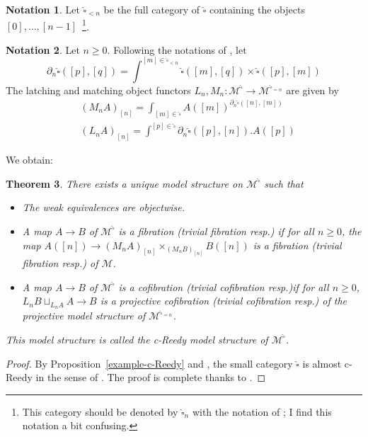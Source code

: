 \documentclass[a4paper,12pt]{amsart}
\newcommand{\de}{\partial}
\newcommand{\p}{\times}
\newtheorem{thm}{Theorem}[section]
\newcommand{\bth}{\begin{thm}}
\renewcommand{\eth}{\end{thm}}
\newcommand{\bpf}{\begin{proof}}
\newcommand{\epf}{\end{proof}}
\theoremstyle{definition}
\newtheorem{nota}[thm]{Notation}
\renewcommand{\geq}{\geqslant}
\begin{document}
\begin{nota}
	Let $\widehat{\square}_{<n}$ be the full category of $\widehat{\square}$ containing the objects $[0],\dots,[n-1]$~\footnote{This category should be denoted by $\widehat{\square}_n$ with the notation of \cite{c-Reedy}; I find this notation a bit confusing.}. 
\end{nota}

\begin{nota} \label{def}
	Let $n\geq 0$. Following the notations of \cite[page~37]{c-Reedy}, let 
	\[
	\de_n\widehat{\square}([p],[q]) = \int^{[m]\in \widehat{\square}_{<n}} \widehat{\square}([m],[q]) \p \widehat{\square}([p],[m])
	\]
The latching and matching object functors $L_n,M_n:\mathcal{M}^{\widehat{\square}}\to \mathcal{M}^{\widehat{\square}_{=n}}$ are given by
\begin{align*}
	& (M_nA)_{[n]} = \int_{[m]\in \widehat{\square}} A([m])^{\de_n\widehat{\square}([n],[m])} \\
	& (L_nA)_{[n]} = \int^{[p]\in \widehat{\square}}\de_n\widehat{\square}([p],[n]) . A([p]) 
\end{align*}
\end{nota}


We obtain: 

\bth \label{c-Reedy-model}
There exists a unique model structure on $\mathcal{M}^{\widehat{\square}}$ such that 
\begin{itemize}
	\item The weak equivalences are objectwise.
	\item A map $A\to B$ of $\mathcal{M}^{\widehat{\square}}$ is a fibration (trivial fibration resp.) if for all $n\geq 0$, the map $A([n])\to (M_nA)_{[n]}\p_{(M_nB)_{[n]}} B([n])$ is a fibration (trivial fibration resp.) of $\mathcal{M}$.
	\item A map $A\to B$ of $\mathcal{M}^{\widehat{\square}}$ is a cofibration (trivial cofibration resp.)if for all $n\geq 0$, $L_nB\sqcup_{L_nA} A\to B$ is a projective cofibration (trivial cofibration resp.) of the projective model structure of $\mathcal{M}^{\widehat{\square}_{=n}}$.
\end{itemize}
This model structure is called the \textit{c-Reedy model structure} of $\mathcal{M}^{\widehat{\square}}$. 
\eth

\bpf
By Proposition~\ref{example-c-Reedy} and \cite[Theorem~8.26]{c-Reedy}, the small category $\widehat{\square}$ is almost c-Reedy in the sense of \cite[Definition~8.8]{c-Reedy}. The proof is complete thanks to \cite[Theorem~8.9]{c-Reedy}.
\epf
\end{document}
